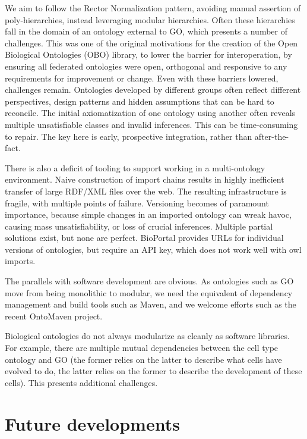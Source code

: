\documentclass{llncs}
\begin{document}
We aim to follow the Rector Normalization pattern, avoiding manual
assertion of poly-hierarchies, instead leveraging modular
hierarchies. Often these hierarchies fall in the domain of an ontology
external to GO, which presents a number of challenges. This was one of
the original motivations for the creation of the Open Biological
Ontologies (OBO) library, to lower the barrier for interoperation, by
ensuring all federated ontologies were open, orthogonal and responsive
to any requirements for improvement or change. Even with these
barriers lowered, challenges remain. Ontologies developed by different
groups often reflect different perspectives, design patterns and
hidden assumptions that can be hard to reconcile. The initial
axiomatization of one ontology using another often reveals multiple
unsatisfiable classes and invalid inferences. This can be
time-consuming to repair. The key here is early, prospective
integration, rather than after-the-fact.

There is also a deficit of tooling to support working in a
multi-ontology environment. Naive construction of import chains
results in highly inefficient transfer of large RDF/XML files over the
web. The resulting infrastructure is fragile, with multiple points of
failure. Versioning becomes of paramount importance, because simple
changes in an imported ontology can wreak havoc, causing mass
unsatisfiability, or loss of crucial inferences. Multiple partial
solutions exist, but none are perfect. BioPortal provides URLs for
individual versions of ontologies, but require an API key, which does
not work well with owl imports.

The parallels with software development are obvious. As ontologies
such as GO move from being monolithic to modular, we need the
equivalent of dependency management and build tools such as Maven, and
we welcome efforts such as the recent OntoMaven
project\cite{paschke2013ontomaven}.

Biological ontologies do not always modularize as cleanly as software
libraries. For example, there are multiple mutual dependencies between
the cell type ontology and GO (the former relies on the latter to
describe what cells have evolved to do, the latter relies on the
former to describe the development of these cells). This presents
additional challenges.



\section{Future developments}
\end{document}
